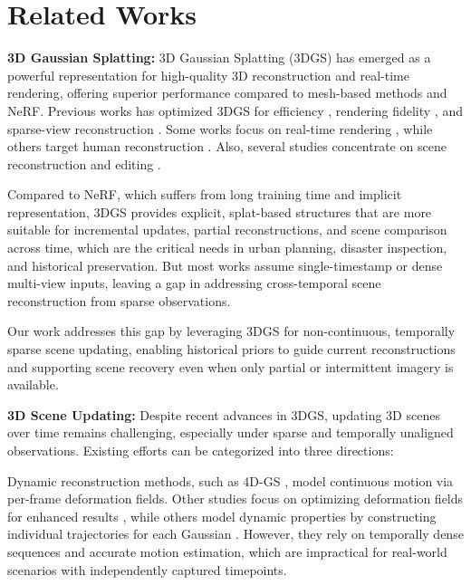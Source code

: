 \documentclass[letterpaper]{article} %
\begin{document}
\section{Related Works}

\textbf{}

\textbf{3D Gaussian Splatting:}
3D Gaussian Splatting (3DGS) has emerged as a powerful representation for high-quality 3D reconstruction and real-time rendering, offering superior performance compared to mesh-based methods and NeRF. Previous works has optimized 3DGS for efficiency \cite{navaneet2023compact3d,niedermayr2024compressed}, rendering fidelity \cite{cheng2024gaussianpro,yan2024multi,zhang2024fregs}, and sparse-view reconstruction \cite{chung2024depth,zhu2023fsgs}. Some works focus on real-time rendering \cite{fan2025fov, li2025mpgs}, while others target human reconstruction \cite{dongye2024adaptive, zhao2024gaussianhand, kleinbeck2025multi}. Also, several studies concentrate on scene reconstruction \cite{schieber2025semantics, wang2025look, zhai2025splatloc} and editing \cite{ren2024palettegaussian, schieber2025semantics}.

Compared to NeRF, which suffers from long training time and implicit representation, 3DGS provides explicit, splat-based structures that are more suitable for incremental updates, partial reconstructions, and scene comparison across time, which are the critical needs in urban planning, disaster inspection, and historical preservation. But most works assume single-timestamp or dense multi-view inputs, leaving a gap in addressing cross-temporal scene reconstruction from sparse observations.

Our work addresses this gap by leveraging 3DGS for non-continuous, temporally sparse scene updating, enabling historical priors to guide current reconstructions and supporting scene recovery even when only partial or intermittent imagery is available.

\textbf{3D Scene Updating:}
Despite recent advances in 3DGS, updating 3D scenes over time remains challenging, especially under sparse and temporally unaligned observations. Existing efforts can be categorized into three directions:

Dynamic reconstruction methods, such as 4D-GS \cite{wu20244d}, model continuous motion via per-frame deformation fields. Other studies focus on optimizing deformation fields for enhanced results \cite{lin2024gaussian, yang2024deformable}, while others model dynamic properties by constructing individual trajectories for each Gaussian \cite{kratimenos2024dynmf, li2024spacetime, luiten2024dynamic}. However, they rely on temporally dense sequences and accurate motion estimation, which are impractical for real-world scenarios with independently captured timepoints.
\end{document}
